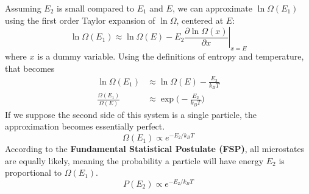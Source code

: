\documentclass[12pt]{article}
\begin{document}
Assuming $E_2$ is small compared to $E_1$ and $E$, we can approximate $\ln \Omega(E_1)$ using the first order Taylor expansion of $\ln \Omega$, centered at $E$:
\[\ln \Omega(E_1) \approx \ln \Omega(E) - E_2 \left. \frac{\partial \ln \Omega(x)}{\partial x} \right|_{x=E}\]
where $x$ is a dummy variable. Using the definitions of entropy and temperature, that becomes
\begin{align*}
    \ln \Omega(E_1) &\approx \ln \Omega(E) - \frac{E_2}{k_B T} \\
    \frac{\Omega(E_1)}{\Omega(E)} &\approx \exp\Big( -\frac{E_2}{k_B T} \Big)
\end{align*}
If we suppose the second side of this system is a single particle, the approximation becomes essentially perfect.
\[\Omega(E_1) \propto e^{- E_2 / k_B T} \]
According to the \textbf{Fundamental Statistical Postulate (FSP)}, all microstates are equally likely, meaning the probability a particle will have energy $E_2$ is proportional to $\Omega(E_1)$.
\[P(E_2) \propto e^{- E_2 / k_B T} \]
\end{document}
